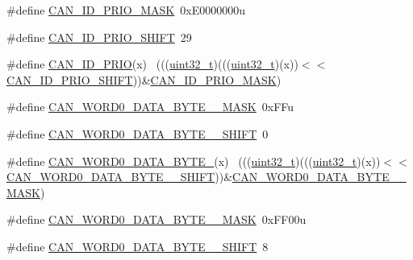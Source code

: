 \begin{DoxyCompactItemize}
\item 
\#define \hyperlink{group___c_a_n___register___masks_gac1e36313ed3d0d09eec97537d3bda962}{C\+A\+N\+\_\+\+I\+D\+\_\+\+P\+R\+I\+O\+\_\+\+M\+A\+SK}~0x\+E0000000u
\item 
\#define \hyperlink{group___c_a_n___register___masks_ga7bd5cd878ee64f1b60ff983442ae7aa9}{C\+A\+N\+\_\+\+I\+D\+\_\+\+P\+R\+I\+O\+\_\+\+S\+H\+I\+FT}~29
\item 
\#define \hyperlink{group___c_a_n___register___masks_ga1c3cfdb5d213e867cbecaac120e8228b}{C\+A\+N\+\_\+\+I\+D\+\_\+\+P\+R\+IO}(x)                                                  ~(((\hyperlink{_p_e___types_8h_a33594304e786b158f3fb30289278f5af}{uint32\+\_\+t})(((\hyperlink{_p_e___types_8h_a33594304e786b158f3fb30289278f5af}{uint32\+\_\+t})(x))$<$$<$\hyperlink{group___c_a_n___register___masks_ga7bd5cd878ee64f1b60ff983442ae7aa9}{C\+A\+N\+\_\+\+I\+D\+\_\+\+P\+R\+I\+O\+\_\+\+S\+H\+I\+FT}))\&\hyperlink{group___c_a_n___register___masks_gac1e36313ed3d0d09eec97537d3bda962}{C\+A\+N\+\_\+\+I\+D\+\_\+\+P\+R\+I\+O\+\_\+\+M\+A\+SK})
\item 
\#define \hyperlink{group___c_a_n___register___masks_ga2b8efb33402c5777d3d7b40c0c84eaac}{C\+A\+N\+\_\+\+W\+O\+R\+D0\+\_\+\+D\+A\+T\+A\+\_\+\+B\+Y\+T\+E\+\_\+\_\+\+M\+A\+SK}~0x\+F\+Fu
\item 
\#define \hyperlink{group___c_a_n___register___masks_ga3835334fa3df07e17141619f9bdb33df}{C\+A\+N\+\_\+\+W\+O\+R\+D0\+\_\+\+D\+A\+T\+A\+\_\+\+B\+Y\+T\+E\+\_\+\_\+\+S\+H\+I\+FT}~0
\item 
\#define \hyperlink{group___c_a_n___register___masks_ga93f067e616626ee01813da6337b42025}{C\+A\+N\+\_\+\+W\+O\+R\+D0\+\_\+\+D\+A\+T\+A\+\_\+\+B\+Y\+T\+E\+\_}(x)                              ~(((\hyperlink{_p_e___types_8h_a33594304e786b158f3fb30289278f5af}{uint32\+\_\+t})(((\hyperlink{_p_e___types_8h_a33594304e786b158f3fb30289278f5af}{uint32\+\_\+t})(x))$<$$<$\hyperlink{group___c_a_n___register___masks_ga3835334fa3df07e17141619f9bdb33df}{C\+A\+N\+\_\+\+W\+O\+R\+D0\+\_\+\+D\+A\+T\+A\+\_\+\+B\+Y\+T\+E\+\_\+\_\+\+S\+H\+I\+FT}))\&\hyperlink{group___c_a_n___register___masks_ga2b8efb33402c5777d3d7b40c0c84eaac}{C\+A\+N\+\_\+\+W\+O\+R\+D0\+\_\+\+D\+A\+T\+A\+\_\+\+B\+Y\+T\+E\+\_\+\_\+\+M\+A\+SK})
\item 
\#define \hyperlink{group___c_a_n___register___masks_gaf5ac3a0da0156c6c331ae39e688d1a6b}{C\+A\+N\+\_\+\+W\+O\+R\+D0\+\_\+\+D\+A\+T\+A\+\_\+\+B\+Y\+T\+E\+\_\+\_\+\+M\+A\+SK}~0x\+F\+F00u
\item 
\#define \hyperlink{group___c_a_n___register___masks_ga30489eaec721b5f42b721c65d8c0cf67}{C\+A\+N\+\_\+\+W\+O\+R\+D0\+\_\+\+D\+A\+T\+A\+\_\+\+B\+Y\+T\+E\+\_\+\_\+\+S\+H\+I\+FT}~8

\end{DoxyCompactItemize}
